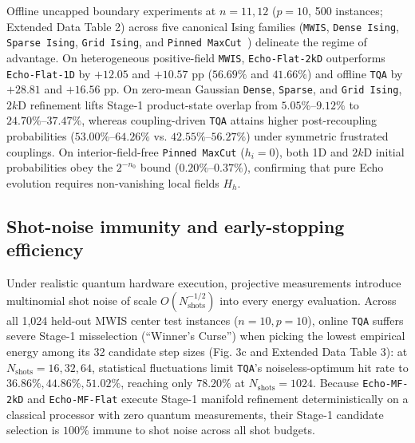 \documentclass[10pt,a4paper]{article}
\begin{document}
Offline uncapped boundary experiments at $n=11, 12$ ($p=10$, 500 instances; Extended Data Table 2) across five canonical Ising families (\texttt{MWIS}, \texttt{Dense Ising}, \texttt{Sparse Ising}, \texttt{Grid Ising}, and \texttt{Pinned MaxCut}~\citep{yao2026echo}) delineate the regime of advantage. On heterogeneous positive-field \texttt{MWIS}, \texttt{Echo-Flat-2kD} outperforms \texttt{Echo-Flat-1D} by $+12.05$ and $+10.57$ pp ($\mathbf{56.69}\%$ and $\mathbf{41.66}\%$) and offline \texttt{TQA} by $\mathbf{+28.81}$ and $\mathbf{+16.56}$ pp. On zero-mean Gaussian \texttt{Dense}, \texttt{Sparse}, and \texttt{Grid Ising}, $2k$D refinement lifts Stage-1 product-state overlap from $5.05\%\mbox{--}9.12\%$ to $24.70\%\mbox{--}37.47\%$, whereas coupling-driven \texttt{TQA} attains higher post-recoupling probabilities ($53.00\%\mbox{--}64.26\%$ vs. $42.55\%\mbox{--}56.27\%$) under symmetric frustrated couplings. On interior-field-free \texttt{Pinned MaxCut} ($h_i = 0$), both 1D and $2k$D initial probabilities obey the $2^{-n_0}$ bound ($0.20\%\mbox{--}0.37\%$), confirming that pure Echo evolution requires non-vanishing local fields $H_h$.


\subsection*{Shot-noise immunity and early-stopping efficiency}

Under realistic quantum hardware execution, projective measurements introduce multinomial shot noise of scale $O(N_{\mathrm{shots}}^{-1/2})$ into every energy evaluation. Across all 1,024 held-out MWIS center test instances ($n=10, p=10$), online \texttt{TQA} suffers severe Stage-1 misselection (``Winner's Curse'') when picking the lowest empirical energy among its 32 candidate step sizes (Fig. 3c and Extended Data Table 3): at $N_{\mathrm{shots}} = 16, 32, 64$, statistical fluctuations limit \texttt{TQA}'s noiseless-optimum hit rate to $36.86\%, 44.86\%, 51.02\%$, reaching only $78.20\%$ at $N_{\mathrm{shots}} = 1024$. Because \texttt{Echo-MF-2kD} and \texttt{Echo-MF-Flat} execute Stage-1 manifold refinement deterministically on a classical processor with zero quantum measurements, their Stage-1 candidate selection is $100\%$ immune to shot noise across all shot budgets.
\end{document}
